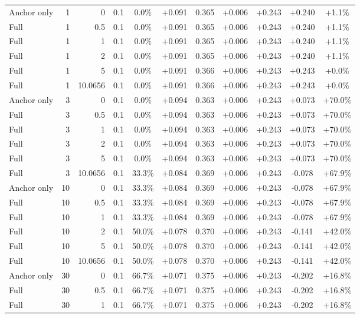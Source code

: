 \begin{table}[htbp]
\begin{tabular}{lrrrccccccc}
Anchor only & 1 & 0 & 0.1 & 0.0\% & +0.091 & 0.365 & +0.006 & +0.243 & +0.240 & +1.1\% \\
Full & 1 & 0.5 & 0.1 & 0.0\% & +0.091 & 0.365 & +0.006 & +0.243 & +0.240 & +1.1\% \\
Full & 1 & 1 & 0.1 & 0.0\% & +0.091 & 0.365 & +0.006 & +0.243 & +0.240 & +1.1\% \\
Full & 1 & 2 & 0.1 & 0.0\% & +0.091 & 0.365 & +0.006 & +0.243 & +0.240 & +1.1\% \\
Full & 1 & 5 & 0.1 & 0.0\% & +0.091 & 0.366 & +0.006 & +0.243 & +0.243 & +0.0\% \\
Full & 1 & 10.0656 & 0.1 & 0.0\% & +0.091 & 0.366 & +0.006 & +0.243 & +0.243 & +0.0\% \\
Anchor only & 3 & 0 & 0.1 & 0.0\% & +0.094 & 0.363 & +0.006 & +0.243 & +0.073 & +70.0\% \\
Full & 3 & 0.5 & 0.1 & 0.0\% & +0.094 & 0.363 & +0.006 & +0.243 & +0.073 & +70.0\% \\
Full & 3 & 1 & 0.1 & 0.0\% & +0.094 & 0.363 & +0.006 & +0.243 & +0.073 & +70.0\% \\
Full & 3 & 2 & 0.1 & 0.0\% & +0.094 & 0.363 & +0.006 & +0.243 & +0.073 & +70.0\% \\
Full & 3 & 5 & 0.1 & 0.0\% & +0.094 & 0.363 & +0.006 & +0.243 & +0.073 & +70.0\% \\
Full & 3 & 10.0656 & 0.1 & 33.3\% & +0.084 & 0.369 & +0.006 & +0.243 & -0.078 & +67.9\% \\
Anchor only & 10 & 0 & 0.1 & 33.3\% & +0.084 & 0.369 & +0.006 & +0.243 & -0.078 & +67.9\% \\
Full & 10 & 0.5 & 0.1 & 33.3\% & +0.084 & 0.369 & +0.006 & +0.243 & -0.078 & +67.9\% \\
Full & 10 & 1 & 0.1 & 33.3\% & +0.084 & 0.369 & +0.006 & +0.243 & -0.078 & +67.9\% \\
Full & 10 & 2 & 0.1 & 50.0\% & +0.078 & 0.370 & +0.006 & +0.243 & -0.141 & +42.0\% \\
Full & 10 & 5 & 0.1 & 50.0\% & +0.078 & 0.370 & +0.006 & +0.243 & -0.141 & +42.0\% \\
Full & 10 & 10.0656 & 0.1 & 50.0\% & +0.078 & 0.370 & +0.006 & +0.243 & -0.141 & +42.0\% \\
Anchor only & 30 & 0 & 0.1 & 66.7\% & +0.071 & 0.375 & +0.006 & +0.243 & -0.202 & +16.8\% \\
Full & 30 & 0.5 & 0.1 & 66.7\% & +0.071 & 0.375 & +0.006 & +0.243 & -0.202 & +16.8\% \\
Full & 30 & 1 & 0.1 & 66.7\% & +0.071 & 0.375 & +0.006 & +0.243 & -0.202 & +16.8\% \\

\end{tabular}
\end{table}
